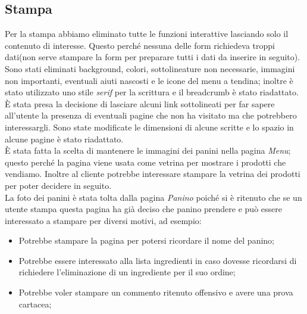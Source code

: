 \subsection{Stampa}
Per la stampa abbiamo eliminato tutte le funzioni interattive lasciando solo il contenuto di interesse.
Questo perché nessuna delle form richiedeva troppi dati(non serve stampare la form per preparare tutti i dati da inserire in seguito).\\
Sono stati eliminati background, colori, sottolineature non necessarie, immagini non importanti, eventuali aiuti nascosti e le icone del menu a tendina;
inoltre è stato utilizzato uno stile \emph{serif} per la scrittura e il breadcrumb è stato riadattato.\\
È stata presa la decisione di lasciare alcuni link sottolineati per far sapere all'utente la presenza di eventuali pagine che non ha visitato ma che potrebbero interessargli. %
Sono state modificate le dimensioni di alcune scritte e lo spazio in alcune pagine è stato riadattato.\\
È stata fatta la scelta di mantenere le immagini dei panini nella pagina \emph{Menu}; 
questo perché la pagina viene usata come vetrina per mostrare i prodotti che vendiamo.
Inoltre al cliente potrebbe interessare stampare la vetrina dei prodotti per poter decidere in seguito.\\
La foto dei panini è stata tolta dalla pagina \emph{Panino} poiché si è ritenuto che se un utente stampa questa pagina ha già deciso che panino prendere e può essere interessato a stampare per diversi motivi, ad esempio:
\begin{itemize}
	\item Potrebbe stampare la pagina per potersi ricordare il nome del panino;
	\item Potrebbe essere interessato alla lista ingredienti in caso dovesse ricordarsi di richiedere l'eliminazione di un ingrediente per il suo ordine;
	\item Potrebbe voler stampare un commento ritenuto offensivo e avere una prova cartacea;
\end{itemize}